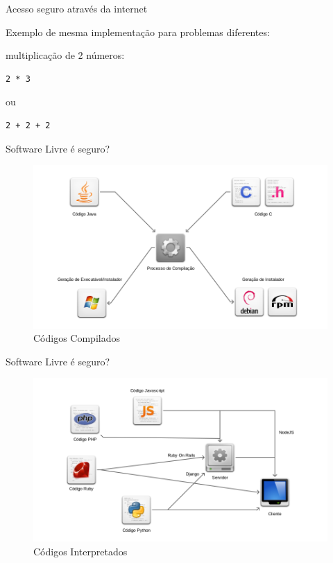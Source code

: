 \begin{frame}[fragile]{Acesso seguro através da internet}

Exemplo de mesma implementação para problemas diferentes:

multiplicação de 2 números:

\begin{verbatim}
2 * 3
\end{verbatim}

ou

\begin{verbatim}
2 + 2 + 2
\end{verbatim}

\end{frame}

\begin{frame}


\end{frame}

\begin{frame}{Software Livre é seguro?}

\begin{figure}
    \includegraphics[scale=0.35]{img/codigos-compilados.png}
    \caption{Códigos Compilados}
\end{figure}

\end{frame}

\begin{frame}{Software Livre é seguro?}

\begin{figure}
    \includegraphics[scale=0.36]{img/codigos-interpretados.png}
    \caption{Códigos Interpretados}
\end{figure}

\end{frame}


